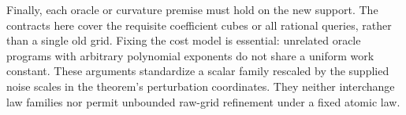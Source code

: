 Finally, each oracle or curvature premise must hold on the new support.
The contracts here cover the requisite coefficient cubes or all rational
queries, rather than a single old grid. Fixing the cost model is
essential: unrelated oracle programs with arbitrary polynomial exponents
do not share a uniform work constant. These arguments standardize a
scalar family rescaled by the supplied noise scales in the theorem's
perturbation coordinates. They neither interchange law families nor
permit unbounded raw-grid refinement under a fixed atomic law.
